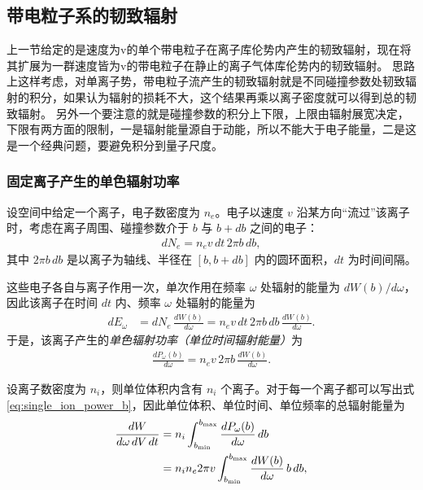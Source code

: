 \subsection{带电粒子系的韧致辐射}
上一节给定的是速度为v的单个带电粒子在离子库伦势内产生的韧致辐射，现在将其扩展为一群速度皆为v的带电粒子在静止的离子气体库伦势内的韧致辐射。
思路上这样考虑，对单离子势，带电粒子流产生的韧致辐射就是不同碰撞参数处韧致辐射的积分，如果认为辐射的损耗不大，这个结果再乘以离子密度就可以得到总的韧致辐射。
另外一个要注意的就是碰撞参数的积分上下限，上限由辐射展宽决定，下限有两方面的限制，一是辐射能量源自于动能，所以不能大于电子能量，二是这是一个经典问题，要避免积分到量子尺度。

\subsubsection{固定离子产生的单色辐射功率}

设空间中给定一个离子，电子数密度为 $n_e$。电子以速度 $v$ 沿某方向“流过”该离子时，考虑在离子周围、碰撞参数介于 $b$ 与 $b+db$ 之间的电子：
\begin{align}
  dN_e = n_e v\,dt \, 2\pi b\,db,
\end{align}
其中 $2\pi b\,db$ 是以离子为轴线、半径在 $[b,b+db]$ 内的圆环面积，$dt$ 为时间间隔。

这些电子各自与离子作用一次，单次作用在频率 $\omega$ 处辐射的能量为 $dW(b)/d\omega$，因此该离子在时间 $dt$ 内、频率 $\omega$ 处辐射的能量为
\begin{align}
  dE_\omega
  &= dN_e \,\frac{dW(b)}{d\omega}
   = n_e v\,dt\,2\pi b\,db\,\frac{dW(b)}{d\omega}.
\end{align}
于是，该离子产生的\emph{单色辐射功率（单位时间辐射能量）}为
\begin{align}
  \frac{dP_\omega(b)}{d\omega}
  = n_e v\,2\pi b\,\frac{dW(b)}{d\omega}.
  \label{eq:single_ion_power_b}
\end{align}

设离子数密度为 $n_i$，则单位体积内含有 $n_i$ 个离子。对于每一个离子都可以写出式\eqref{eq:single_ion_power_b}，因此单位体积、单位时间、单位频率的总辐射能量为
\begin{align}
  \frac{dW}{d\omega\,dV\,dt}
  &= n_i \int_{b_{\min}}^{b_{\max}}
     \frac{dP_\omega(b)}{d\omega}\,db \notag\\
  &= n_i n_e 2\pi v
     \int_{b_{\min}}^{b_{\max}}
     \frac{dW(b)}{d\omega}\,b\,db,
  \label{eq:spec_power_density_general}
\end{align}

